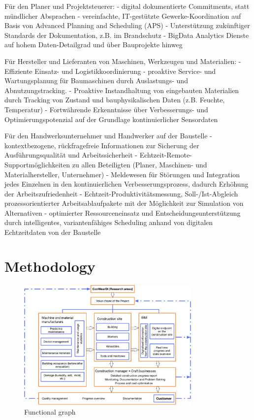 Für den Planer und Projektsteuerer:
- digital dokumentierte Commitments, statt mündlicher Absprachen
- vereinfachte, IT-gestützte Gewerke-Koordination auf Basis von Advanced Planning and Scheduling (APS)
- Unterstützung zukünftiger Standards der Dokumentation, z.B. im Brandschutz
- BigData Analytics Dienste auf hohem Daten-Detailgrad und über Bauprojekte hinweg


Für Hersteller und Lieferanten von Maschinen, Werkzeugen und Materialien:
- Effiziente Einsatz- und Logistikkoordinierung 
- proaktive Service- und Wartungsplanung für Baumaschinen durch Auslastungs- und Abnutzungstracking.
- Proaktive Instandhaltung von eingebauten Materialien durch Tracking von Zustand und bauphysikalischen Daten (z.B. Feuchte, Temperatur) 
- Fortwährende Erkenntnisse über Verbesserungs- und Optimierungspotenzial auf der Grundlage kontinuierlicher Sensordaten


Für den Handwerksunternehmer und Handwerker auf der Baustelle
- kontextbezogene, rückfragefreie Informationen zur Sicherung der Ausführungsqualität und Arbeitssicherheit
- Echtzeit-Remote-Supportmöglichkeiten zu allen Beteiligten (Planer, Maschinen- und Materialhersteller, Unternehmer)
- Meldewesen für Störungen und Integration jedes Einzelnen in den kontinuierlichen Verbesserungsprozess, dadurch Erhöhung der Arbeitszufriedenheit
- Echtzeit-Produktivitätsmessung, Soll-/Ist-Abgleich prozessorientierter Arbeitsablaufpakete mit der Möglichkeit zur Simulation von Alternativen
- optimierter Ressourceneinsatz und Entscheidungsunterstützung durch intelligentes, variantenfähiges Scheduling anhand von digitalen Echtzeitdaten von der Baustelle


\section{Methodology}

\begin{figure}[!h]
\includegraphics[width=0.8\textwidth]{figures/conweardi-functional}
\caption{Functional graph}
\end{figure}

